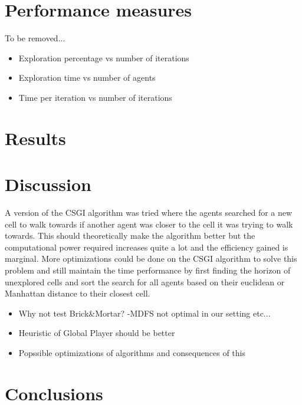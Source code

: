 \documentclass{article}
\begin{document}
\section{Performance measures}
To be removed...
\begin{itemize}
\item Exploration percentage vs number of iterations
\item Exploration time vs number of agents
\item Time per iteration vs number of iterations
\end{itemize}

\section{Results}

\section{Discussion}

A version of the CSGI algorithm was tried where the agents searched for a new cell to walk towards if another agent was closer to the cell it was trying to walk towards. This should theoretically make the algorithm better but the computational power required increases quite a lot and the efficiency gained is marginal. More optimizations could be done on the CSGI algorithm to solve this problem and still maintain the time performance by first finding the horizon of unexplored cells and sort the search for all agents based on their euclidean or Manhattan distance to their closest cell.


\begin{itemize}
    \item Why not test Brick\&Mortar? -MDFS not optimal in our setting etc...
    \item Heuristic of Global Player should be better
    \item Popssible optimizations of algorithms and consequences of this
\end{itemize}

\section{Conclusions}




\end{document}
